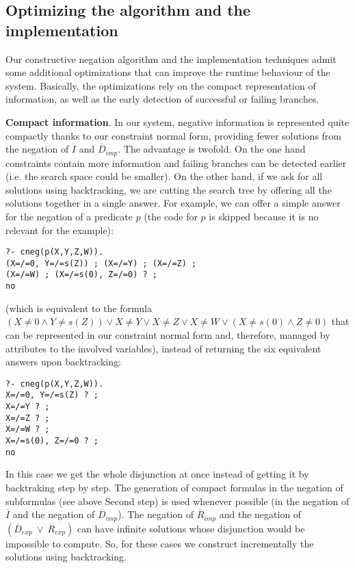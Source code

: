 \documentclass{llncs}
\begin{document}

\subsection{Optimizing the algorithm and the implementation}
\label{optimization}

Our constructive negation algorithm and the implementation techniques
admit some additional optimizations that can improve the runtime
behaviour of the system. Basically, the optimizations rely on the
compact representation of information, as well as the early detection
of successful or failing branches.

\noindent
{\bf Compact information}. In our system, negative information is
represented quite compactly thanks to our constraint normal form,
providing fewer solutions from the negation of $\overline{I}$ and
$\overline{D}_{imp}$. The advantage is twofold. On the one hand
constraints contain more information and failing branches can be
detected earlier (i.e. the search space could be smaller). On the
other hand, if we ask for all solutions using backtracking, we are
cutting the search tree by offering all the solutions together in a
single answer. For example, we can offer a simple answer for the
negation of a predicate $p$ (the code for $p$ is skipped because it is
no relevant for the example): {\small
\begin{verbatim}
?- cneg(p(X,Y,Z,W)).
(X=/=0, Y=/=s(Z)) ; (X=/=Y) ; (X=/=Z) ; 
(X=/=W) ; (X=/=s(0), Z=/=0) ? ;
no
\end{verbatim}
}
\noindent
(which is equivalent to the formula $ (X \neq 0 \wedge Y\neq s(Z))
\vee X \neq Y \vee X \neq Z \vee X \neq W \vee (X \neq s(0) \wedge Z
\neq 0)$ that can be represented in our constraint normal form and,
therefore, managed by attributes to the involved variables), instead
of returning the six equivalent answers upon backtracking: {\small
\begin{verbatim}
?- cneg(p(X,Y,Z,W)).
X=/=0, Y=/=s(Z) ? ;
X=/=Y ? ;
X=/=Z ? ;
X=/=W ? ;
X=/=s(0), Z=/=0 ? ;
no
\end{verbatim}
} 
\noindent
In this case we get the whole disjunction at once instead of getting
it by backtraking step by step. The generation of compact formulas in
the negation of subformulas (see above Second step) is used whenever
possible (in the negation of $\overline{I}$ and the negation of
$\overline{D}_{imp}$). The negation of $\overline{R}_{imp}$ and the
negation of $(\overline{D}_{exp} ~ \vee ~ \overline{R}_{exp})$ can
have infinite solutions whose disjunction would be impossible to
compute. So, for these cases we construct incrementally the solutions
using backtracking.
\end{document}
